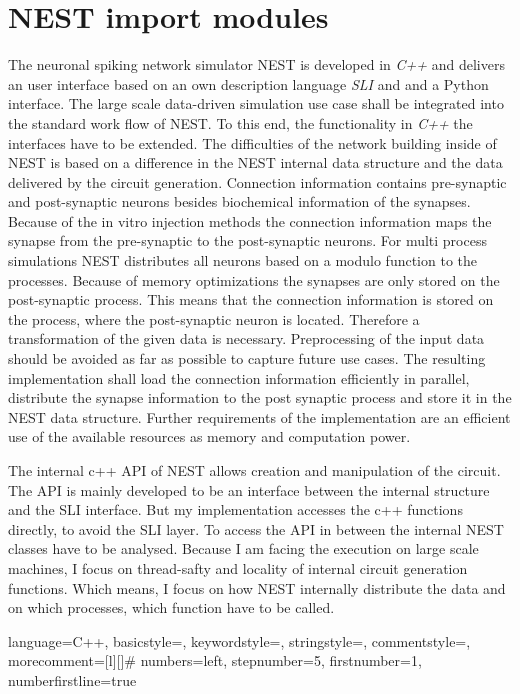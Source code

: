 \section{NEST import modules}
The neuronal spiking network simulator NEST is developed in \emph{C++} and delivers
an user interface based on an own description language \emph{SLI} and  and a Python interface.
The large scale data-driven simulation use case shall be integrated into the standard work flow of NEST.
To this end, the functionality in \emph{C++} the interfaces have to be extended.
The difficulties of the network building inside of NEST is based on a difference in 
the NEST internal data structure and the data delivered by the circuit generation.
Connection information contains pre-synaptic and post-synaptic neurons besides biochemical
information of the synapses. Because of the in vitro injection methods the
connection information maps the synapse from the pre-synaptic to the post-synaptic neurons.
For multi process simulations NEST distributes all neurons based on a modulo function 
to the processes. Because of memory optimizations the synapses are only stored on the
post-synaptic process. This means that the connection information is stored
on the process, where the post-synaptic neuron is located. Therefore a transformation of the given data is
necessary. Preprocessing of the input data should be avoided as far as possible to capture
future use cases.
The resulting implementation shall load the connection information efficiently in parallel,
distribute the synapse information to the post synaptic process and store it in
the NEST data structure.
Further requirements of the implementation are an efficient use of the available resources as
memory and computation power. 

The internal c++ API of NEST allows creation and manipulation of the circuit.
The API is mainly developed to be an interface between the internal structure
and the SLI interface. But my implementation accesses the c++ functions directly,
to avoid the SLI layer. To access the API in between the internal NEST classes
have to be analysed. Because I am facing the execution on large scale machines,
I focus on thread-safty and locality of internal circuit generation functions.
Which means, I focus on how NEST internally distribute the data and on which processes, which
function have to be called.


 {language=C++,
                basicstyle=\small\ttfamily,
                keywordstyle=\color{blue}\ttfamily,
                stringstyle=\color{red}\ttfamily,
                commentstyle=\color{green}\ttfamily,
                morecomment=[l][\color{magenta}]{\#}
                numbers=left,
  				stepnumber=5,    
  				firstnumber=1,
 				numberfirstline=true
}

